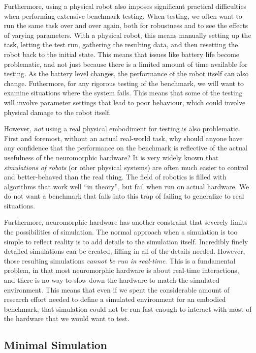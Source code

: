 \documentclass{frontiersSCNS} %
\begin{document}
Furthermore, using a physical robot also imposes significant practical
difficulties when performing extensive benchmark testing.  When testing, we
often want to run the same task over and over again, both for robustness and
to see the effects of varying parameters.  With a physical robot, this means
manually setting up the task, letting the test run, gathering the resulting
data, and then resetting the robot back to the initial state.  This means that
issues like battery life become problematic, and not just because there is a
limited amount of time available for testing.  As the battery level changes,
the performance of the robot itself can also change.  Futhermore, for any
rigorous testing of the benchmark, we will want to examine situations where
the system fails.  This means that some of the testing will involve parameter
settings that lead to poor behaviour, which could involve physical damage to
the robot itself.

However, \emph{not} using a real physical embodiment for testing is also
problematic.  First and foremost, without an actual real-world task, why
should anyone have any confidence that the performance on the benchmark is
reflective of the actual usefulness of the neuromorphic hardware?  It is
very widely known that \emph{simulations of robots} (or other physical systems) are
often much easier to control and better-behaved than the real thing.  The
field of robotics is filled with algorithms that work well ``in theory'', but
fail when run on actual hardware.  We do not want a benchmark that falls into
this trap of failing to generalize to real situations.

Furthermore, neuromorphic hardware has another constraint that severely limits
the possibilities of simulation.  The normal approach when a simulation is
too simple to reflect reality is to add details to the simulation itself.
Incredibly finely detailed simulations can be created, filling in all of the
details needed.  However, those resulting simulations \emph{cannot be run
in real-time}.  This is a fundamental problem, in that most neuromorphic
hardware is about real-time interactions, and there is no way to slow down
the hardware to match the simulated environment.  This means that even if
we spent the considerable amount of research effort needed to define a
simulated environment for an embodied benchmark, that simulation could not
be run fast enough to interact with most of the hardware that we would want
to test.

\subsection{Minimal Simulation}
\end{document}
